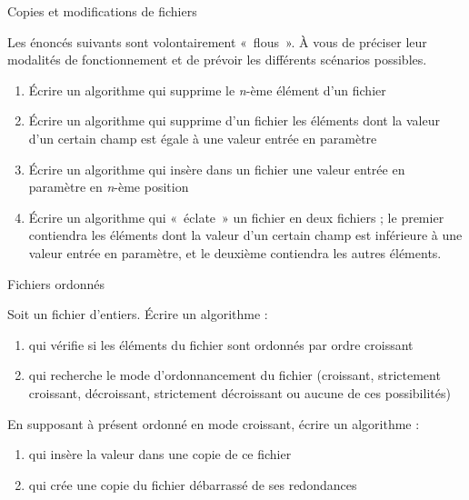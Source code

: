 \begin{Exercice}{Copies et modifications de fichiers}
	
	Les énoncés suivants sont volontairement «~flous~». À vous de préciser
	leur modalités de fonctionnement et de prévoir les différents scénarios
	possibles.
	
	\begin{enumerate}[label=\alph*)]
		\item 
			Écrire un algorithme qui supprime le \textit{n}{}-ème élément d’un
			fichier
		\item 
			Écrire un algorithme qui supprime d’un fichier les éléments dont la
			valeur d’un certain champ est égale à une valeur entrée en paramètre 
		\item 
			Écrire un algorithme qui insère dans un fichier une valeur entrée en
			paramètre en \textit{n}{}-ème position
		\item 
			Écrire un algorithme qui «~éclate~» un fichier en deux fichiers ; le
			premier contiendra les éléments dont la valeur d’un certain champ est
			inférieure à une valeur entrée en paramètre, et le deuxième contiendra
			les autres éléments.
	\end{enumerate}
\end{Exercice}

\begin{Exercice}{Fichiers ordonnés}

	Soit  un fichier d’entiers. Écrire un algorithme :

	\begin{enumerate}[label=\alph*)]
		\item 
			qui vérifie si les éléments du fichier sont ordonnés par ordre
			croissant
		\item 
			qui recherche le mode d’ordonnancement du fichier (croissant,
			strictement croissant, décroissant, strictement décroissant ou aucune
			de ces possibilités)
	\end{enumerate}
	
	En supposant à présent  ordonné en mode croissant, écrire un
	algorithme :

	\begin{enumerate}[label=\alph*)]
		\item 
			qui insère la valeur  dans une copie de ce fichier
		\item 
			qui crée une copie du fichier débarrassé de ses redondances
	\end{enumerate}
\end{Exercice}

